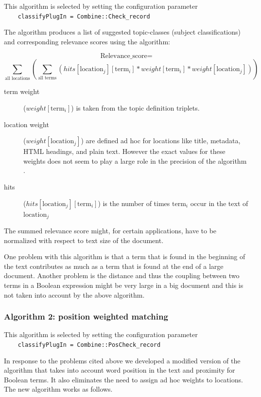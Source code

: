 This algorithm is selected by setting the configuration parameter\\
\verb+    classifyPlugIn = Combine::Check_record+

The algorithm produces a list of suggested topic-classes (subject classifications) and
corresponding relevance scores using the algorithm:

\vbox{
\[ \mbox{Relevance\_score} = \]
\[ \sum_{\mbox{all locations}} \left( \sum_{\mbox{all terms}} (hits[\mbox{location}_{j}][\mbox{term
}_{i}] * weight[\mbox{term}_{i}] * weight[\mbox{location}_{j}]) \right) \]}

\begin{description}
\item[term weight] ($weight[\mbox{term}_{i}]$) is taken from the topic definition
triplets. 
\item[location weight] ($weight[\mbox{location}_{j}]$) are
defined ad hoc for locations like title, metadata, HTML headings, and plain
text. However the exact values for these weights does not seem to play
a large role in the precision of the algorithm \cite{ardo05:_ECDL}.
\item[hits] ($hits[\mbox{location}_{j}][\mbox{term}_{i}]$) is the
number of times $\mbox{term}_{i}$ occur in the text of $\mbox{location}_{j}$
\end{description}

The summed relevance score might, for certain applications, have to be
normalized with respect to text size of the document.

One problem with this algorithm is that a term that is found in the
beginning of the text contributes as much as a term that is found at
the end of a large document. Another problem is the distance and thus
the coupling between two terms in a Boolean expression might be very
large in a big document and this is not taken into account by the
above algorithm.

\subsubsection{Algorithm 2: position weighted matching}
\label{pos}
This algorithm is selected by setting the configuration parameter\\
\verb+    classifyPlugIn = Combine::PosCheck_record+

In response to the problems cited above we developed a modified
version of the algorithm that takes into account word position in the
text and proximity for Boolean terms. It also eliminates the need to
assign ad hoc weights to locations. The new algorithm works as
follows.

